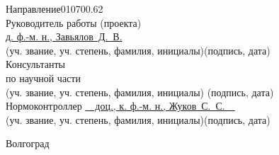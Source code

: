 \begin{titlepage}
\begin{flushleft}
		Направление\hspace{1cm}010700.62\\
		Руководитель работы (проекта)\\
		\underline{д. ф.-м. н., Завьялов~Д.~В.}\hfill\underline{\hspace{5cm}}\\
		\vspace{-.2cm}\hspace{.4cm}\footnotesize(уч. звание, уч. степень, 
			фамилия, инициалы)\hspace{6.5cm}(подпись, дата)\normalsize\\
		Консультанты\\
		по научной части \underline{\hspace{7cm}}\hfill%
			\underline{\hspace{5cm}}\\\vspace{-.2cm}\hspace{4cm}%
			\footnotesize(уч. звание, уч. степень, фамилия, инициалы)%
			\hspace{3cm}(подпись, дата)\normalsize\\
		Нормоконтроллер \underline{\ \ доц., к. ф.-м. н., Жуков~С.~С.\ \ }
			\hfill\underline{\hspace{5cm}}\\
		\vspace{-.2cm}\hspace{4cm}\footnotesize(уч. звание, уч. степень, 
			фамилия, инициалы)\hspace{3cm}(подпись, дата)\normalsize\\
	\end{flushleft}

	\vspace{\fill}

	\begin{center}
		Волгоград \the\year
	\end{center}
\end{titlepage}

